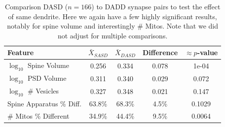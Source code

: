 \documentclass[12pt]{article}
\theoremstyle{definition}
\begin{document}




 




\begin{table}[tb]
  \caption{Comparison DASD ($n=166$) to DADD synapse pairs to test the effect of same dendrite.
  Here we again have a few highly significant results, notably for spine volume and interestingly \# Mitos. 
  Note that we did not adjust for multiple comparisons. }
  \label{tab:dasdVSdadd}
  \begin{center}
    \begin{tabular}{l|cccc}
    \hline

    \hline
Feature                  & $\bar{X}_{SASD}$ & $\bar{X}_{DASD}$ & Difference & $\approx p$-value  \\
    \hline
$\log_{10}$ Spine Volume & 0.256  & 0.334  & 0.078 & 1e-04 \\
$\log_{10}$ PSD Volume   & 0.311  & 0.340  & 0.029 & 0.072 \\
$\log_{10}$ \# Vesicles  & 0.327  & 0.348  & 0.021 & 0.147 \\
Spine Apparatus \% Diff. & 63.8\% & 68.3\% & 4.5\% & 0.1029 \\
\# Mitos \% Different    & 34.9\% & 44.4\% & 9.5\% & 0.0064 \\
    \hline
    \end{tabular}
  \end{center}
\end{table}
\end{document}
